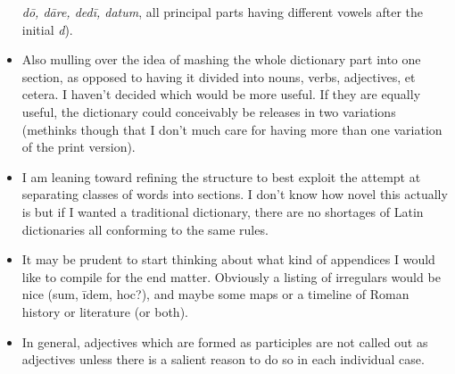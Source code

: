 \begin{itemize}
    \textit{d\=o, d\=are, ded\=i, datum}, all principal parts
    having different vowels after the initial \textit{d}).
  \item Also mulling over the idea of mashing the whole
    dictionary part into one section, as opposed to having
    it divided into nouns, verbs, adjectives, et cetera.
    I haven't decided which would be more useful.  If they
    are equally useful, the dictionary could conceivably
    be releases in two variations (methinks though that I
    don't much care for having more than one variation of
    the print version).
  \item I am leaning toward refining the structure to best
    exploit the attempt at separating classes of words into
    sections.  I don't know how novel this actually is but
    if I wanted a traditional dictionary, there are no
    shortages of Latin dictionaries all conforming to the
    same rules.
  \item It may be prudent to start thinking about what kind
    of appendices I would like to compile for the end
    matter.  Obviously a listing of irregulars would be
    nice (sum, \=idem, hoc?), and maybe some maps or a
    timeline of Roman history or literature (or both).
  \item In general, adjectives which are formed as
    participles are not called out as adjectives unless
    there is a salient reason to do so in each individual
    case.
\end{itemize}
